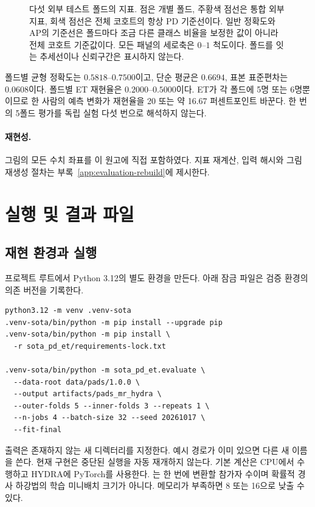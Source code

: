 \documentclass[11pt,a4paper]{article}
\newcommand{\code}[1]{\texttt{\detokenize{#1}}}
\numberwithin{equation}{section}
\begin{document}
\begin{figure}[H]
\caption{다섯 외부 테스트 폴드의 지표. 점은 개별 폴드, 주황색 점선은
통합 외부 지표, 회색 점선은 전체 코호트의 항상 PD 기준선이다.
일반 정확도와 AP의 기준선은 폴드마다 조금 다른 클래스 비율을 보정한 값이
아니라 전체 코호트 기준값이다. 모든 패널의 세로축은 \(0\)--\(1\) 척도이다.
폴드를 잇는 추세선이나 신뢰구간은 표시하지 않는다.}
\label{fig:evaluation-folds}
\end{figure}

폴드별 균형 정확도는 \(0.5818\)--\(0.7500\)이고,
단순 평균은 \(0.6694\), 표본 표준편차는 \(0.0608\)이다.
폴드별 ET 재현율은 \(0.2000\)--\(0.5000\)이다.
ET가 각 폴드에 5명 또는 6명뿐이므로 한 사람의 예측 변화가 재현율을
20 또는 약 16.67 퍼센트포인트 바꾼다.
한 번의 5폴드 평가를 독립 실험 다섯 번으로 해석하지 않는다.

\paragraph{재현성.}
그림의 모든 수치 좌표를 이 원고에 직접 포함하였다.
지표 재계산, 입력 해시와 그림 재생성 절차는 부록~\ref{app:evaluation-rebuild}에 제시한다.
\clearpage

\section{실행 및 결과 파일}
\subsection{재현 환경과 실행}
프로젝트 루트에서 Python 3.12의 별도 환경을 만든다.
아래 잠금 파일은 검증 환경의 의존 버전을 기록한다.
\begin{lstlisting}
python3.12 -m venv .venv-sota
.venv-sota/bin/python -m pip install --upgrade pip
.venv-sota/bin/python -m pip install \
  -r sota_pd_et/requirements-lock.txt

.venv-sota/bin/python -m sota_pd_et.evaluate \
  --data-root data/pads/1.0.0 \
  --output artifacts/pads_mr_hydra \
  --outer-folds 5 --inner-folds 3 --repeats 1 \
  --n-jobs 4 --batch-size 32 --seed 20261017 \
  --fit-final
\end{lstlisting}
출력은 존재하지 않는 새 디렉터리를 지정한다.
예시 경로가 이미 있으면 다른 새 이름을 쓴다.
현재 구현은 중단된 실행을 자동 재개하지 않는다.
기본 계산은 CPU에서 수행하고 HYDRA에 PyTorch를 사용한다.
\code{batch-size}는 한 번에 변환할 참가자 수이며
확률적 경사 하강법의 학습 미니배치 크기가 아니다.
메모리가 부족하면 8 또는 16으로 낮출 수 있다.
\end{document}
